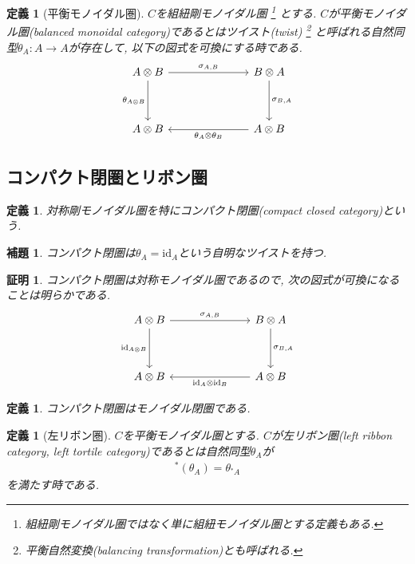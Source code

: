 \documentclass[a4paper,12pt]{ltjsarticle}
\theoremstyle{break}
\newtheorem{defn}[thm]{定義}
\newtheorem{lem}[thm]{補題}
\newtheorem*{prf}{証明}
\newcommand{\id}{\mathrm{id}}
\newcommand{\si}{\sigma}
\newcommand{\ot}{\otimes}
\numberwithin{equation}{section}
\begin{document}
\begin{defn}[平衡モノイダル圏]
  $C$を組紐剛モノイダル圏
  \footnote{
    組紐剛モノイダル圏ではなく単に組紐モノイダル圏とする定義もある. 
  } 
  とする. 
  $C$が平衡モノイダル圏(balanced monoidal category)であるとはツイスト(twist)
  \footnote{
    平衡自然変換(balancing transformation)とも呼ばれる. 
  }
  と呼ばれる自然同型$\theta_A: A \to A$が存在して, 以下の図式を可換にする時である. 
  \[\begin{tikzcd}
    {A \ot B} &&& {B \ot A} \\
    \\
    {A \ot B} &&& {A \ot B}
    \arrow["{\si_{A,B}}", from=1-1, to=1-4]
    \arrow["{\si_{B,A}}", from=1-4, to=3-4]
    \arrow["{\theta_A \ot \theta_B}", from=3-4, to=3-1]
    \arrow["{\theta_{A \ot B}}"', from=1-1, to=3-1]
  \end{tikzcd}\]
\end{defn}

\subsection{コンパクト閉圏とリボン圏}

\begin{defn}
  対称剛モノイダル圏を特にコンパクト閉圏(compact closed category)という. 
\end{defn}

\begin{lem}
  コンパクト閉圏は$\theta_A=\id_A$という自明なツイストを持つ. 
\end{lem}

\begin{prf}
  コンパクト閉圏は対称モノイダル圏であるので, 次の図式が可換になることは明らかである.
  \[\begin{tikzcd}
    {A \ot B} &&& {B \ot A} \\
    \\
    {A \ot B} &&& {A \ot B}
    \arrow["{\si_{A,B}}", from=1-1, to=1-4]
    \arrow["{\id_{A \ot B}}"', from=1-1, to=3-1]
    \arrow["{\si_{B,A}}", from=1-4, to=3-4]
    \arrow["{\id_A \ot \id_B}", from=3-4, to=3-1]
  \end{tikzcd}\]
\end{prf}

\begin{defn}
  コンパクト閉圏はモノイダル閉圏である. 
\end{defn}

\begin{defn}[左リボン圏]
  $C$を平衡モノイダル圏とする. $C$が左リボン圏(left ribbon category, left tortile category)であるとは自然同型$\theta_A$が
  \begin{align*}
    {}^*(\theta_A)=\theta_{{}^*A}
  \end{align*}
  を満たす時である. 
\end{defn}
\end{document}
